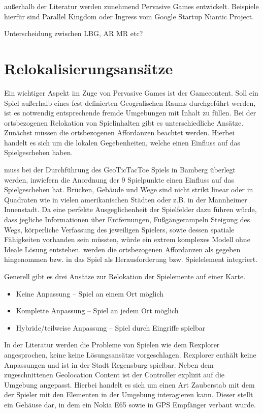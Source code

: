 außerhalb der Literatur werden zunehmend Pervasive Games entwickelt.
Beispiele hierfür sind Parallel Kingdom oder Ingress vom Google Startup Niantic Project.

Unterscheidung zwischen LBG, AR MR etc?

\section{Relokalisierungsansätze}
\label{ch3:s:Relokalisierung}

Ein wichtiger Aspekt im Zuge von Pervasive Games ist der Gamecontent. Soll ein Spiel außerhalb eines fest definierten Geografischen Raums durchgeführt werden, ist es notwendig entsprechende fremde Umgebungen mit Inhalt zu füllen. \cite{Montola.2005} 
Bei der ortsbezogenen Relokation von Spielinhalten gibt es unterschiedliche Ansätze.
Zunächst müssen die ortsbezogenen Affordanzen beachtet werden. Hierbei handelt es sich um die lokalen Gegebenheiten, welche einen Einfluss auf das Spielgeschehen haben.

muss bei der Durchführung des GeoTicTacToe Spiels in Bamberg überlegt werden, inwiefern die Anordnung der 9 Spielpunkte einen Einfluss auf das Spielgeschehen hat. Brücken, Gebäude und Wege sind nicht strikt linear oder in Quadraten wie in vielen amerikanischen Städten oder z.B. in der Mannheimer Innenstadt. Da eine perfekte Ausgeglichenheit der Spielfelder dazu führen würde, dass jegliche Informationen über Entfernungen, Fußgängerampeln Steigung des Wegs, körperliche Verfassung des jeweiligen Spielers, sowie dessen spatiale Fähigkeiten vorhanden sein müssten, würde ein extrem komplexes Modell ohne Ideale Lösung entstehen. werden die ortsbezogenen Affordanzen als gegeben hingenommen bzw. in das Spiel als Herausforderung bzw. Spielelement integriert.

Generell gibt es drei Ansätze zur Relokation der Spielemente auf einer Karte.

\begin{itemize}
\item Keine Anpassung -- Spiel an einem Ort möglich
\item Komplette Anpassung -- Spiel an jedem Ort möglich
\item Hybride/teilweise Anpassung -- Spiel durch Eingriffe spielbar
\end{itemize}

In der Literatur werden die Probleme von Spielen wie dem Rexplorer\cite{Ballagas.2007} angesprochen, keine keine Lösungsansätze vorgeschlagen. Rexplorer enthält keine Anpassungen und ist in der Stadt Regensburg spielbar. Neben dem zugeschnittenen Geolocation Content ist der Controller explizit auf die Umgebung angepasst.
Hierbei handelt es sich um einen Art Zauberstab mit dem der Spieler mit den Elementen in der Umgebung interagieren kann. Dieser stellt ein Gehäuse dar, in dem ein Nokia E65 sowie in GPS Empfänger verbaut wurde.

